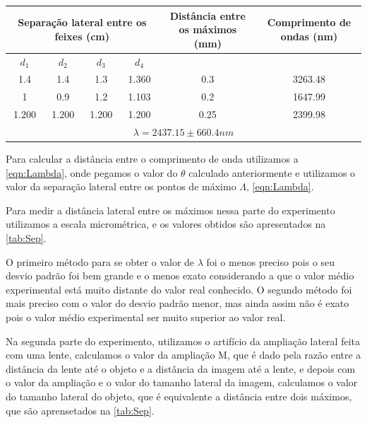 \documentclass[
12pt,				%
openright,			%
oneside,			%
a4paper,			%
english,			%
french,				%
spanish,			%
brazil,				%
]{abntex2}
\begin{document}
\begin{table}[htb]
  {%
    \begin{tabular}{cccccc}
      \toprule
      \multicolumn{4}{c}{Separação lateral entre os feixes (cm)} & Distância entre os máximos (mm) & Comprimento de ondas (nm) \\
      \midrule \midrule
      $d_{1}$ & $d_{2}$ & $d_{3}$& $d_{4}$& ~ &  ~ \\
      \hline
      1.4 & 1.4 & 1.3 & 1.360 & 0.3 & 3263.48 \\
      \hline
      1 & 0.9 & 1.2 & 1.103 & 0.2& 1647.99 \\
      \hline
      1.200& 1.200& 1.200 & 1.200 & 0.25&  2399.98 \\
      \hline
      \multicolumn{6}{c}{$\lambda = 2437.15 \pm 660.4 nm$}\\
      \bottomrule
    \end{tabular}%
  }
  {%
  }
\end{table}



Para calcular a distância entre o comprimento de onda utilizamos a \autoref{eqn:Lambda}, onde pegamos o valor do $\theta$ calculado anteriormente e utilizamos o valor da
separação lateral entre os pontos de máximo $\Lambda$, \autoref{eqn:Lambda}.
 

Para medir a distância lateral entre os máximos nessa parte do experimento
utilizamos a escala micrométrica, e os valores obtidos são apresentados na \autoref{tab:Sep}.


O primeiro método para se obter o valor de $\lambda$ foi o menos preciso pois o seu desvio padrão foi bem grande e o menos exato considerando a que o valor médio experimental está muito distante do valor real conhecido. O segundo método foi mais preciso com o valor do desvio padrão menor, mas ainda assim não é exato pois o valor médio experimental ser muito superior ao valor real. 


Na segunda parte do experimento, utilizamos o artifício da ampliação lateral
feita com uma lente, calculamos o valor da ampliação M, que é dado pela
razão entre a distância da lente até o objeto e a distância da imagem até a
lente, e depois com o valor da ampliação e o valor do tamanho lateral da
imagem, calculamos o valor do tamanho lateral do objeto, que é equivalente a
distância entre dois máximos, que são aprensetados na \autoref{tab:Sep}.
\end{document}
